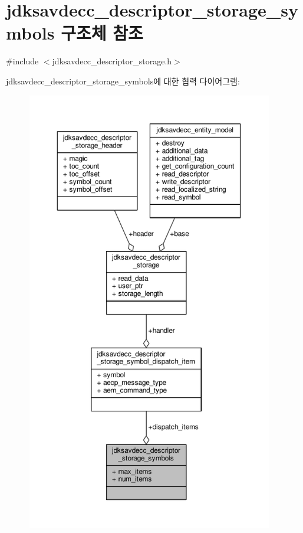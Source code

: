 \hypertarget{structjdksavdecc__descriptor__storage__symbols}{}\section{jdksavdecc\+\_\+descriptor\+\_\+storage\+\_\+symbols 구조체 참조}
\label{structjdksavdecc__descriptor__storage__symbols}


{\ttfamily \#include $<$jdksavdecc\+\_\+descriptor\+\_\+storage.\+h$>$}



jdksavdecc\+\_\+descriptor\+\_\+storage\+\_\+symbols에 대한 협력 다이어그램\+:
\nopagebreak
\begin{figure}[H]
\begin{center}
\leavevmode
\includegraphics[height=550pt]{structjdksavdecc__descriptor__storage__symbols__coll__graph}
\end{center}
\end{figure}
